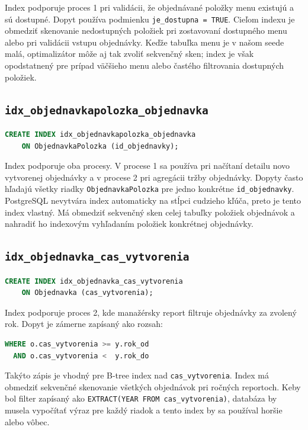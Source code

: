 \documentclass[11pt, a4paper]{article}
\begin{document}
Index podporuje proces 1 pri validácii, že objednávané položky menu existujú a sú dostupné.
Dopyt používa podmienku \texttt{je\_dostupna = TRUE}. Cieľom indexu je obmedziť skenovanie
nedostupných položiek pri zostavovaní dostupného menu alebo pri validácii vstupu objednávky.
Keďže tabuľka menu je v našom seede malá, optimalizátor môže aj tak zvoliť sekvenčný sken; index
je však opodstatnený pre prípad väčšieho menu alebo častého filtrovania dostupných položiek.

\subsection*{\texttt{idx\_objednavkapolozka\_objednavka}}

\begin{lstlisting}[language=SQL]
CREATE INDEX idx_objednavkapolozka_objednavka
    ON ObjednavkaPolozka (id_objednavky);
\end{lstlisting}

Index podporuje oba procesy. V procese 1 sa používa pri načítaní detailu novo vytvorenej
objednávky a v procese 2 pri agregácii tržby objednávky. Dopyty často hľadajú všetky riadky
\texttt{ObjednavkaPolozka} pre jedno konkrétne \texttt{id\_objednavky}. PostgreSQL nevytvára index
automaticky na stĺpci cudzieho kľúča, preto je tento index vlastný. Má obmedziť sekvenčný sken
celej tabuľky položiek objednávok a nahradiť ho indexovým vyhľadaním položiek konkrétnej
objednávky.

\subsection*{\texttt{idx\_objednavka\_cas\_vytvorenia}}

\begin{lstlisting}[language=SQL]
CREATE INDEX idx_objednavka_cas_vytvorenia
    ON Objednavka (cas_vytvorenia);
\end{lstlisting}

Index podporuje proces 2, kde manažérsky report filtruje objednávky za zvolený rok. Dopyt je
zámerne zapísaný ako rozsah:

\begin{lstlisting}[language=SQL]
WHERE o.cas_vytvorenia >= y.rok_od
  AND o.cas_vytvorenia <  y.rok_do
\end{lstlisting}

Takýto zápis je vhodný pre B-tree index nad \texttt{cas\_vytvorenia}. Index má obmedziť
sekvenčné skenovanie všetkých objednávok pri ročných reportoch. Keby bol filter zapísaný ako
\texttt{EXTRACT(YEAR FROM cas\_vytvorenia)}, databáza by musela vypočítať výraz pre každý riadok
a tento index by sa používal horšie alebo vôbec.
\end{document}
